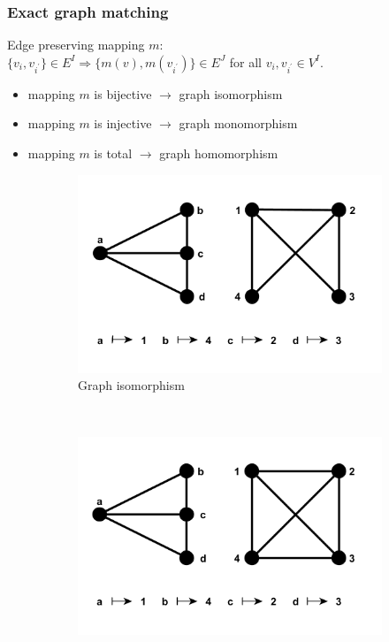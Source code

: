 \documentclass[hyperref={pdfpagelabels=false}]{beamer}
\begin{document}
\begin{frame}
\frametitle{Exact graph matching}
Edge preserving mapping $m$:\\
$\{v_i,v_{i^\prime}\}\in E^I\Rightarrow\{m(v),m(v_{i^\prime})\}\in E^J$ for all $v_i,v_{i^\prime}\in V^I$.


\begin{itemize}
\item mapping $m$ is bijective $\rightarrow$ graph isomorphism
\item mapping $m$ is injective $\rightarrow$ graph monomorphism
\item mapping $m$ is total\hspace{15pt} $\rightarrow$ graph homomorphism
\end{itemize}
\begin{figure}[h!]
    \centering
    \begin{subfigure}[b]{0.3\textwidth}
        \includegraphics[width=\textwidth]{fig/GI}
        \caption{Graph isomorphism}
        \label{fig:GI}
    \end{subfigure}
    ~
    \begin{subfigure}[b]{0.3\textwidth}
        \includegraphics[width=\textwidth]{fig/monomorphism}

\end{subfigure}
\end{figure}
\end{frame}
\end{document}

